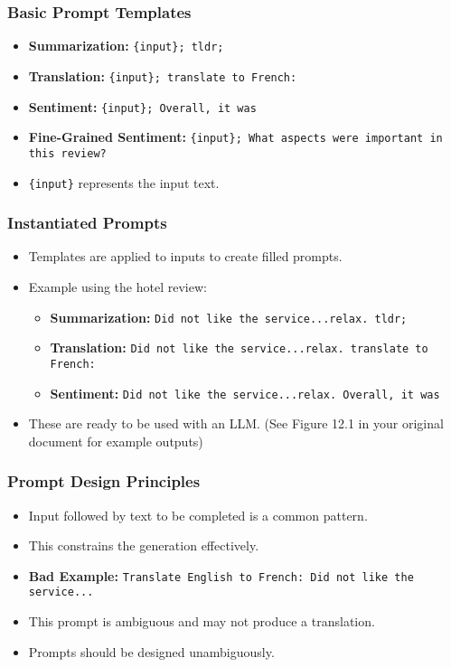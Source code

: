 \documentclass{beamer}
\begin{document}
\begin{frame}
    \frametitle{Basic Prompt Templates}
    \begin{itemize}
        \item \textbf{Summarization:} \texttt{\{input\}; tldr;}
        \item \textbf{Translation:} \texttt{\{input\}; translate to French:}
        \item \textbf{Sentiment:} \texttt{\{input\}; Overall, it was}
        \item \textbf{Fine-Grained Sentiment:} \texttt{\{input\}; What aspects were important in this review?}
        \item \texttt{\{input\}} represents the input text.
    \end{itemize}
\end{frame}

\begin{frame}
    \frametitle{Instantiated Prompts}
    \begin{itemize}
        \item Templates are applied to inputs to create filled prompts.
        \item Example using the hotel review:
        \begin{itemize}
            \item \textbf{Summarization:} \texttt{Did not like the service...relax. tldr;}
            \item \textbf{Translation:} \texttt{Did not like the service...relax. translate to French:}
            \item \textbf{Sentiment:} \texttt{Did not like the service...relax. Overall, it was}
        \end{itemize}
        \item These are ready to be used with an LLM.  (See Figure 12.1 in your original document for example outputs)
    \end{itemize}
\end{frame}

\begin{frame}
    \frametitle{Prompt Design Principles}
    \begin{itemize}
        \item Input followed by text to be completed is a common pattern.
        \item This constrains the generation effectively.
        \item \textbf{Bad Example:} \texttt{Translate English to French: Did not like the service...}
        \item This prompt is ambiguous and may not produce a translation.
        \item Prompts should be designed unambiguously.
    \end{itemize}
\end{frame}
\end{document}
